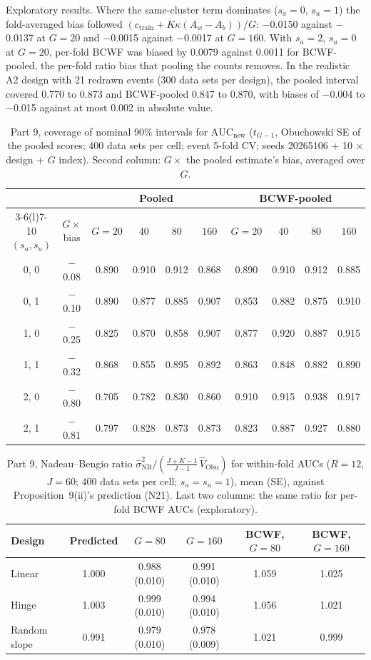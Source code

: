 \documentclass[11pt]{amsart}
\theoremstyle{plain}
\theoremstyle{definition}
\theoremstyle{remark}
\newcommand{\VNB}{\hat\sigma^2_{\mathrm{NB}}}
\newcommand{\fac}{\tfrac{J+K-1}{J-1}}
\begin{document}
Exploratory results. Where the same-cluster term dominates ($s_a=0$, $s_u=1$) the fold-averaged bias followed $(c_{\mathrm{train}}+K\kappa(A_w-A_b))/G$: $-$0.0150 against $-$0.0137 at $G=20$ and $-$0.0015 against $-$0.0017 at $G=160$. With $s_a=2$, $s_u=0$ at $G=20$, per-fold BCWF was biased by 0.0079 against 0.0011 for BCWF-pooled, the per-fold ratio bias that pooling the counts removes. In the realistic A2 design with 21 redrawn events (300 data sets per design), the pooled interval covered 0.770 to 0.873 and BCWF-pooled 0.847 to 0.870, with biases of $-$0.004 to $-$0.015 against at most 0.002 in absolute value.

\begin{table}[tbp]
\centering\footnotesize
\caption{Part 9, coverage of nominal 90\% intervals for $\mathrm{AUC}_{\mathrm{new}}$ ($t_{G-1}$, Obuchowski SE of the pooled scores; 400 data sets per cell; event 5-fold CV; seeds 20265106 + 10 $\times$ design + $G$ index). Second column: $G\times$ the pooled estimate's bias, averaged over $G$.}\label{tab:auccov}
\begin{tabular}{@{}c c c c c c c c c c@{}}
\toprule
 & & \multicolumn{4}{c}{Pooled} & \multicolumn{4}{c}{BCWF-pooled}\\
\cmidrule(lr){3-6}\cmidrule(l){7-10}
$(s_a,s_u)$ & $G\times$bias & $G=20$ & $40$ & $80$ & $160$ & $G=20$ & $40$ & $80$ & $160$\\
\midrule
0, 0 & $-$0.08 & 0.890 & 0.910 & 0.912 & 0.868 & 0.890 & 0.910 & 0.912 & 0.885 \\
0, 1 & $-$0.10 & 0.890 & 0.877 & 0.885 & 0.907 & 0.853 & 0.882 & 0.875 & 0.910 \\
1, 0 & $-$0.25 & 0.825 & 0.870 & 0.858 & 0.907 & 0.877 & 0.920 & 0.887 & 0.915 \\
1, 1 & $-$0.32 & 0.868 & 0.855 & 0.895 & 0.892 & 0.863 & 0.848 & 0.882 & 0.890 \\
2, 0 & $-$0.80 & 0.705 & 0.782 & 0.830 & 0.860 & 0.910 & 0.915 & 0.938 & 0.917 \\
2, 1 & $-$0.81 & 0.797 & 0.828 & 0.873 & 0.873 & 0.823 & 0.887 & 0.927 & 0.880 \\
\bottomrule
\end{tabular}
\end{table}

\begin{table}[tbp]
\centering\footnotesize
\caption{Part 9, Nadeau--Bengio ratio $\VNB/(\fac\,\hat V_{\mathrm{Obu}})$ for within-fold AUCs ($R=12$, $J=60$; 400 data sets per cell; $s_a=s_u=1$), mean (SE), against Proposition~9(ii)'s prediction (N21). Last two columns: the same ratio for per-fold BCWF AUCs (exploratory).}\label{tab:aucnb}
\begin{tabular}{@{}l c c c c c@{}}
\toprule
Design & Predicted & $G=80$ & $G=160$ & BCWF, $G=80$ & BCWF, $G=160$\\
\midrule
Linear & 1.000 & 0.988 (0.010) & 0.991 (0.010) & 1.059 & 1.025 \\
Hinge & 1.003 & 0.999 (0.010) & 0.994 (0.010) & 1.056 & 1.021 \\
Random slope & 0.991 & 0.979 (0.010) & 0.978 (0.009) & 1.021 & 0.999 \\
\bottomrule
\end{tabular}
\end{table}
\end{document}
